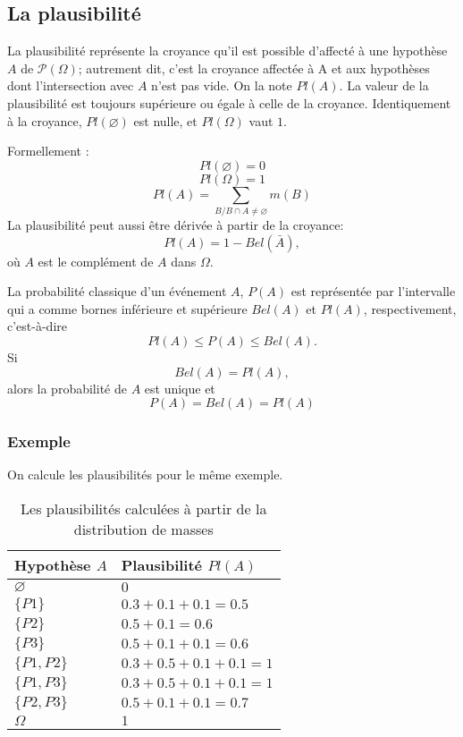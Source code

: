 \subsection{La plausibilité}

La plausibilité représente la croyance qu’il est possible
d’affecté à une hypothèse $A$ de $\mathcal{P}(\Omega)$; autrement dit,
c’est la croyance affectée à A et aux hypothèses dont l'intersection
avec $A$ n’est pas vide. On la note $Pl(A)$. La valeur de la plausibilité est
toujours supérieure ou égale à celle de la croyance. Identiquement à la
croyance, $Pl(\varnothing)$ est nulle, et $Pl(\Omega)$ vaut $1$.

Formellement :
\begin{equation}
Pl(\varnothing) = 0
\end{equation}
\begin{equation}
Pl(\Omega) = 1
\end{equation}
\begin{equation}
Pl(A) = \sum_{B \slash B \cap A \neq \varnothing} m(B)
\end{equation}
La plausibilité peut aussi être dérivée à partir de la croyance:
\begin{equation}
Pl(A) = 1 - Bel(\bar{A}),
\end{equation}
où $A$ est le complément de $A$ dans $\Omega$.

La probabilité classique d’un événement $A$, $P(A)$ est représentée par
l’intervalle qui a comme bornes inférieure et supérieure $Bel(A)$ et $Pl(A)$,
respectivement, c’est-à-dire $$Pl(A) \leq P(A) \leq Bel(A).$$
Si $$Bel(A) = Pl(A),$$ alors la probabilité de $A$ est unique et $$P(A) = Bel(A) = Pl(A)$$

\subsubsection{Exemple}
On calcule les plausibilités pour le même exemple.

\begin{table}[h!]
\centering
\begin{tabular}{|l|l|}
\hline
Hypothèse $A$ & Plausibilité $Pl(A)$\\
\hline
$\varnothing$ & $0$ \\
\hline
$\{P1\}$ & $0.3 + 0.1 + 0.1 = 0.5$ \\
\hline
$\{P2\}$ & $0.5 + 0.1 = 0.6$ \\
\hline
$\{P3\}$ & $0.5 + 0.1 + 0.1 = 0.6$ \\
\hline
$\{P1, P2\}$ & $0.3 + 0.5 + 0.1 + 0.1 = 1$ \\
\hline
$\{P1, P3\}$ & $0.3 + 0.5 + 0.1 + 0.1 = 1$ \\
\hline
$\{P2, P3\}$ & $0.5 + 0.1 + 0.1 = 0.7$ \\
\hline
$\Omega$ & $1$ \\
\hline
\end{tabular}
\caption{Les plausibilités calculées à partir de la distribution de masses}
\end{table}
